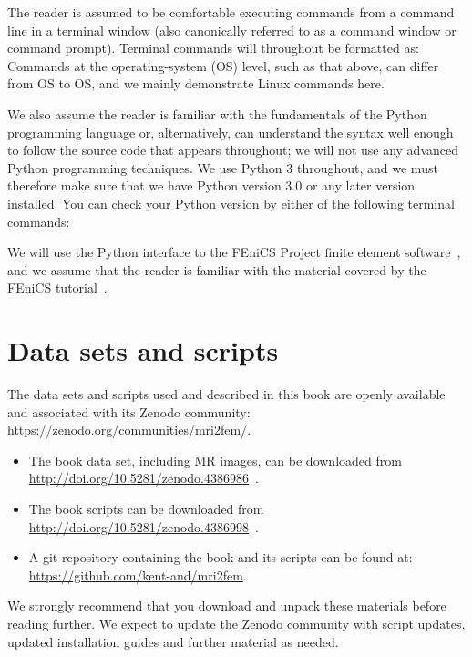 The reader is assumed to be comfortable executing commands from a
command line in a terminal window (also canonically referred
to as a command window or command prompt). Terminal commands
will throughout be formatted as:
\noindent Commands at the operating-system (OS) level, such as that above,
can differ from OS to OS, and we mainly demonstrate Linux commands
here.

We also assume the reader is familiar with the fundamentals of the
Python programming language or, alternatively, can understand the
syntax well enough to follow the source code that appears throughout;
we will not use any advanced Python programming techniques. We use
Python 3 throughout, and we must therefore make sure that we have Python
version 3.0 or any later version installed. You can check
your Python version by either of the following terminal commands:

We will use the Python interface to the FEniCS Project finite
element software~\cite{alnaes2015fenics}, and we assume that the
reader is familiar with the material covered by the FEniCS
tutorial~\cite{langtangen2016solving}.

\section{Data sets and scripts}


The data sets and scripts used and described in this book are openly
available and associated with its Zenodo community:
\url{https://zenodo.org/communities/mri2fem/}. 
\begin{itemize}
\item
  The book data set, including MR images, can be downloaded from \\
  \url{http://doi.org/10.5281/zenodo.4386986}~\cite{kent_andre_mardal_2020_4386986}.
\item
  The book scripts can be downloaded from \\
  \url{http://doi.org/10.5281/zenodo.4386998}~\cite{kent_andre_mardal_2020_4386998}.
\item 
  A git repository containing the book and its scripts can be found 
  at: \\ \url{https://github.com/kent-and/mri2fem}.
\end{itemize}
We strongly recommend that you download and unpack these materials
before reading further. We expect to update the Zenodo community with
script updates, updated installation guides and further material as
needed.
 
